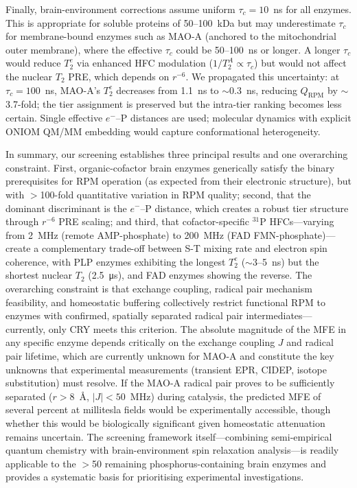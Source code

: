 \documentclass[11pt]{article}
\begin{document}
Finally, brain-environment corrections assume uniform $\tau_c = 10$~ns for all enzymes. This is appropriate for soluble proteins of 50--100~kDa but may underestimate $\tau_c$ for membrane-bound enzymes such as MAO-A (anchored to the mitochondrial outer membrane), where the effective $\tau_c$ could be 50--100~ns or longer. A longer $\tau_c$ would reduce $T_2^e$ via enhanced HFC modulation ($1/T_2^A \propto \tau_c$) but would not affect the nuclear $T_2$ PRE, which depends on $r^{-6}$. We propagated this uncertainty: at $\tau_c = 100$~ns, MAO-A's $T_2^e$ decreases from 1.1~ns to $\sim$0.3~ns, reducing $Q_\mathrm{RPM}$ by $\sim$3.7-fold; the tier assignment is preserved but the intra-tier ranking becomes less certain. Single effective $e^-$--P distances are used; molecular dynamics with explicit ONIOM QM/MM embedding would capture conformational heterogeneity.

In summary, our screening establishes three principal results and one overarching constraint. First, organic-cofactor brain enzymes generically satisfy the binary prerequisites for RPM operation (as expected from their electronic structure), but with $>$100-fold quantitative variation in RPM quality; second, that the dominant discriminant is the $e^-$--P distance, which creates a robust tier structure through $r^{-6}$ PRE scaling; and third, that cofactor-specific $^{31}$P HFCs---varying from 2~MHz (remote AMP-phosphate) to 200~MHz (FAD FMN-phosphate)---create a complementary trade-off between S-T mixing rate and electron spin coherence, with PLP enzymes exhibiting the longest $T_2^e$ ($\sim$3--5~ns) but the shortest nuclear $T_2$ (2.5~\si{\micro\second}), and FAD enzymes showing the reverse. The overarching constraint is that exchange coupling, radical pair mechanism feasibility, and homeostatic buffering collectively restrict functional RPM to enzymes with confirmed, spatially separated radical pair intermediates---currently, only CRY meets this criterion. The absolute magnitude of the MFE in any specific enzyme depends critically on the exchange coupling $J$ and radical pair lifetime, which are currently unknown for MAO-A and constitute the key unknowns that experimental measurements (transient EPR, CIDEP, isotope substitution) must resolve. If the MAO-A radical pair proves to be sufficiently separated ($r > 8$~\AA, $|J| < 50$~MHz) during catalysis, the predicted MFE of several percent at millitesla fields would be experimentally accessible, though whether this would be biologically significant given homeostatic attenuation remains uncertain. The screening framework itself---combining semi-empirical quantum chemistry with brain-environment spin relaxation analysis---is readily applicable to the $>$50 remaining phosphorus-containing brain enzymes and provides a systematic basis for prioritising experimental investigations.
\end{document}
